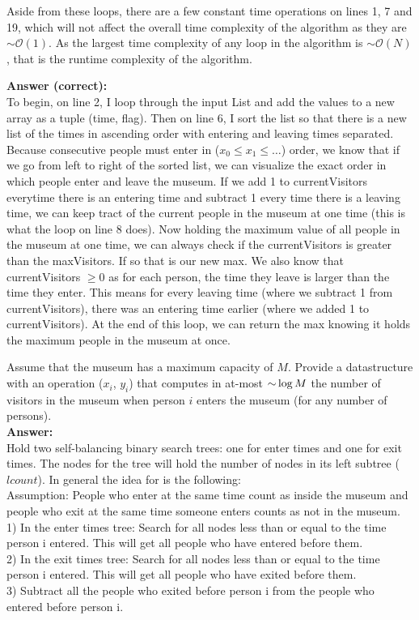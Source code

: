 \begin{problem}
\begin{questions}
Aside from these loops, there are a few constant time operations on lines 1, 7 and 19, which will not affect the overall time complexity of the algorithm as they are $\sim \mathcal{O}(1)$. As the largest time complexity of any loop in the algorithm is $\sim \mathcal{O}(N)$, that is the runtime complexity of the algorithm.

\textbf{Answer (correct):}\\
To begin, on line 2, I loop through the input List and add the values to a new array as a tuple (time, flag). Then on line 6, I sort the list so that there is a new list of the times in ascending order with entering and leaving times separated. Because consecutive people must enter in ($x_0 \leq x_1 \leq \dots$) order, we know that if we go from left to right of the sorted list, we can visualize the exact order in which people enter and leave the museum. If we add 1 to currentVisitors everytime there is an entering time and subtract 1 every time there is a leaving time, we can keep tract of the current people in the museum at one time (this is what the loop on line 8 does). Now holding the maximum value of all people in the museum at one time, we can always check if the currentVisitors is greater than the maxVisitors. If so that is our new max. We also know that currentVisitors $\geq 0$ as for each person, the time they leave is larger than the time they enter. This means for every leaving time (where we subtract 1 from currentVisitors), there was an entering time earlier (where we added 1 to currentVisitors). At the end of this loop, we can return the max knowing it holds the maximum people in the museum at once.

\item Assume that the museum has a maximum capacity of $M$. Provide a datastructure with an operation ($x_i$, $y_i$) that computes in at-most $\mathord{\sim}\log M$ the number of visitors in the museum when person $i$ enters the museum (for any number of persons).\\
\textbf{Answer:}\\
Hold two self-balancing binary search trees: one for enter times and one for exit times. The nodes for the tree will hold the number of nodes in its left subtree ($lcount$). In general the idea for  is the following:\\
Assumption: People who enter at the same time count as inside the museum and people who exit at the same time someone enters counts as not in the museum.\\
1) In the enter times tree: Search for all nodes less than or equal to the time person i entered. This will get all people who have entered before them.\\
2) In the exit times tree: Search for all nodes less than or equal to the time person i entered. This will get all people who have exited before them.\\
3) Subtract all the people who exited before person i from the people who entered before person i.


\end{questions}
\end{problem}
